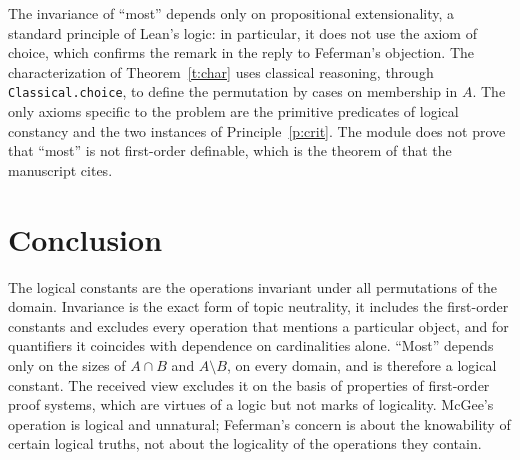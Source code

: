 \documentclass{situationist-preprint}
\begin{document}
The invariance of \enquote{most} depends only on propositional extensionality, a standard principle of Lean's logic: in particular, it does not use the axiom of choice, which confirms the remark in the reply to Feferman's objection. The characterization of Theorem~\ref{t:char} uses classical reasoning, through \texttt{Classical.choice}, to define the permutation by cases on membership in $A$. The only axioms specific to the problem are the primitive predicates of logical constancy and the two instances of Principle~\ref{p:crit}. The module does not prove that \enquote{most} is not first-order definable, which is the theorem of \citet{BarwiseCooper1981} that the manuscript cites.

\section{Conclusion}

The logical constants are the operations invariant under all permutations of the domain. Invariance is the exact form of topic neutrality, it includes the first-order constants and excludes every operation that mentions a particular object, and for quantifiers it coincides with dependence on cardinalities alone. \enquote{Most} depends only on the sizes of $A \cap B$ and $A \setminus B$, on every domain, and is therefore a logical constant. The received view excludes it on the basis of properties of first-order proof systems, which are virtues of a logic but not marks of logicality. McGee's operation is logical and unnatural; Feferman's concern is about the knowability of certain logical truths, not about the logicality of the operations they contain.
\end{document}
